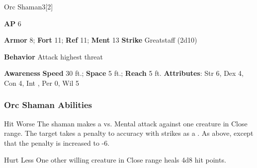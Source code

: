 \begin{monsection}{Orc Shaman}{3}[2]
\vspace{-1em}\vspace{-1em}
\begin{spellcontent}
\begin{spelltargetinginfo}
{\textbf{AP} 6}

\pari \textbf{Armor} 8;
\textbf{Fort} 11;
\textbf{Ref} 11;
\textbf{Ment} 13
\pari \textbf{Strike} Greatstaff  (2d10)



\pari \textbf{Behavior} Attack highest threat
\end{spelltargetinginfo}
\end{spellcontent}

\begin{monsterfooter}
\pari \textbf{Awareness} 
\pari \textbf{Speed} 30 ft.;
\textbf{Space} 5 ft.;
\textbf{Reach} 5 ft.
\pari \textbf{Attributes}:
Str 6,
Dex 4,
Con 4,
Int ,
Per 0,
Wil 5
\end{monsterfooter}
\end{monsection}


\subsubsection{Orc Shaman Abilities}

\begin{freeability}{Hit Worse}
The shaman makes a  vs. Mental attack against one creature in Close range.
\hit The target takes a  penalty to accuracy with strikes as a .
\crit As above, except that the penalty is increased to -6.
\end{freeability}

\vspace{0.5em}
\begin{freeability}{Hurt Less}
One other willing creature in Close range heals 4d8 hit points.
\end{freeability}

